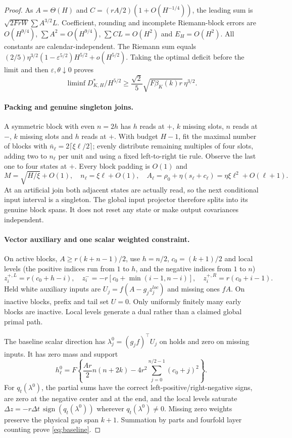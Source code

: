 \documentclass[11pt]{article}
\begin{document}
\begin{proof}
As $A=\Theta(H)$ and $C=(rA/2)(1+O(H^{-1/4}))$, the leading sum is
$\sqrt{2FrW}\sum A^{3/2}L$.
Coefficient, rounding and incomplete Riemann-block errors are $O(H^{9/4})$,
$\sum A^2=O(H^{9/4})$, $\sum CL=O(H^2)$ and $E_H=O(H^2)$.
All constants are calendar-independent.
The Riemann sum equals
$(2/5)\eta^{3/2}(1-\varepsilon^{5/2})H^{5/2}+o(H^{5/2})$.
Taking the optimal deficit before the limit and then
$\varepsilon,\theta\downarrow0$ proves
\begin{equation}\label{eq:lower}
\liminf D_{K,H}^*/H^{5/2}\ge
\frac{\sqrt2}{5}\sqrt{F\beta_K(k)r}\,\eta^{3/2}.
\end{equation}

\paragraph{Packing and genuine singleton joins.}
A symmetric block with even $n=2h$ has $h$ reads at $+$, $k$ missing slots,
$n$ reads at $-$, $k$ missing slots and $h$ reads at $+$.
With budget $H-1$, fit the maximal number of blocks with
$\bar n_\ell=2\lceil\xi\ell/2\rceil$; evenly distribute remaining multiples of
four slots, adding two to $n_\ell$ per unit and using a fixed left-to-right
tie rule. Observe the last one to four states at $+$.
Every block padding is $O(1)$ and
\[
M=\sqrt{H/\xi}+O(1),\quad n_\ell=\xi\ell+O(1),\quad
A_\ell=\rho_0+\eta(s_\ell+c_\ell)=\eta\xi\ell^2+O(\ell+1).
\]
At an artificial join both adjacent states are actually read, so the next
conditional input interval is a singleton.
The global input projector therefore splits into its genuine block spans.
It does not reset any state or make output covariances independent.

\paragraph{Vector auxiliary and one scalar weighted constraint.}
On active blocks, $A\ge r(k+n-1)/2$, use $h=n/2$, $c_0=(k+1)/2$ and local levels (the positive indices run from $1$ to $h$,
and the negative indices from $1$ to $n$)
\[
z_i^{+,L}=r(c_0+h-i),\quad
z_i^-=-r[c_0+\min(i-1,n-i)],\quad
z_i^{+,R}=r(c_0+i-1).
\]
Held white auxiliary inputs are $U_j=f(A-g_jz_j^{loc})$ and missing ones $fA$.
On inactive blocks, prefix and tail set $U=0$.
Only uniformly finitely many early blocks are inactive.
Local levels generate a dual rather than a claimed global primal path.

The baseline scalar direction has $\lambda_j^0=(g_jf)^\top U_j$ on holds
and zero on missing inputs. It has zero mass and support
\begin{equation}\label{eq:baseline}
h_\ell^0=F\left\{\frac{Ar}{2}n(n+2k)
-4r^2\sum_{j=0}^{n/2-1}(c_0+j)^2\right\}.
\end{equation}
For $q_t(\lambda^0)$, the partial sums have the correct left-positive/right-negative signs,
are zero at the negative center and at the end, and the local levels
saturate $\Delta z=-r\Delta t\,\operatorname{sign}(q_t(\lambda^0))$ wherever $q_t(\lambda^0)\ne0$.
Missing zero weights preserve the physical gap span $k+1$.
Summation by parts and fourfold layer counting prove \eqref{eq:baseline}.


\end{proof}
\end{document}

